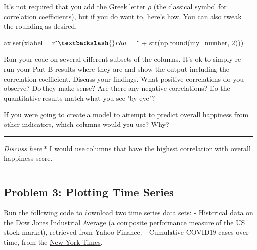 \documentclass[11pt]{article}
\newenvironment{Shaded}{}{}
\newcommand{\DecValTok}[1]{\textcolor[rgb]{0.25,0.63,0.44}{{#1}}}
\newcommand{\NormalTok}[1]{{#1}}
\newcommand{\VerbatimStringTok}[1]{\textcolor[rgb]{0.25,0.44,0.63}{{#1}}}
\newcommand{\OperatorTok}[1]{\textcolor[rgb]{0.40,0.40,0.40}{{#1}}}
\newcommand{\BuiltInTok}[1]{{#1}}
\begin{document}
It's not required that you add the Greek letter \(\rho\) (the classical
symbol for correlation coefficients), but if you do want to, here's how.
You can also tweak the rounding as desired.

\begin{Shaded}
\begin{Highlighting}[]
\NormalTok{ax.}\BuiltInTok{set}\NormalTok{(xlabel }\OperatorTok{=} \VerbatimStringTok{r"$\textbackslash{}rho$ = "} \OperatorTok{+} \BuiltInTok{str}\NormalTok{(np.}\BuiltInTok{round}\NormalTok{(my_number, }\DecValTok{2}\NormalTok{)))}
\end{Highlighting}
\end{Shaded}

    Run your code on several different subsets of the columns. It's ok to
simply re-run your Part B results where they are and show the output
including the correlation coefficient. Discuss your findings. What
positive correlations do you observe? Do they make sense? Are there any
negative correlations? Do the quantitative results match what you see
"by eye"?

If you were going to create a model to attempt to predict overall
happiness from other indicators, which columns would you use? Why?

\begin{center}\rule{0.5\linewidth}{\linethickness}\end{center}

\emph{Discuss here} * I would use columns that have the highest
correlation with overall happiness score.

\begin{center}\rule{0.5\linewidth}{\linethickness}\end{center}

    \subsection{Problem 3: Plotting Time
Series}\label{problem-3-plotting-time-series}

Run the following code to download two time series data sets: -
Historical data on the Dow Jones Industrial Average (a composite
performance measure of the US stock market), retrieved from Yahoo
Finance. - Cumulative COVID19 cases over time, from the
\href{https://github.com/nytimes/covid-19-data}{New York Times}.
\end{document}
